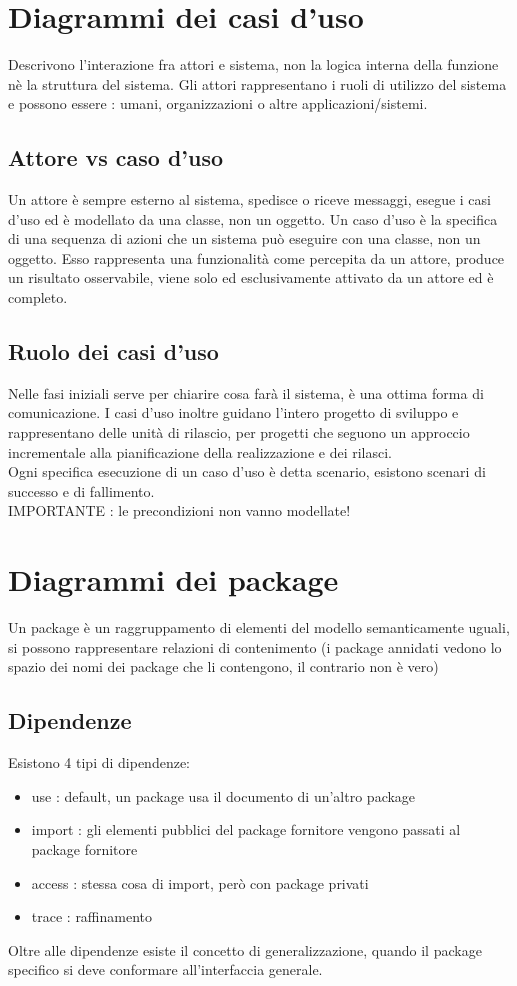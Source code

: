 \documentclass[a4paper,12pt]{report}
\begin{document}
	\section{Diagrammi dei casi d'uso}
	Descrivono l'interazione fra attori e sistema, non la logica interna della funzione nè la struttura del sistema. Gli attori rappresentano i ruoli di utilizzo del sistema e possono essere : umani, organizzazioni o altre applicazioni/sistemi.
	\subsection{Attore vs caso d'uso}
	Un attore è sempre esterno al sistema, spedisce o riceve messaggi, esegue i casi d'uso ed è modellato da una classe, non un oggetto.
	Un caso d'uso è la specifica di una sequenza di azioni che un sistema può eseguire con una classe, non un oggetto. Esso rappresenta una funzionalità come percepita da un attore, produce un risultato osservabile, viene solo ed esclusivamente attivato da un attore ed è completo.
	\subsection{Ruolo dei casi d'uso}
	Nelle fasi iniziali serve per chiarire cosa farà il sistema, è una ottima forma di comunicazione. I casi d'uso inoltre guidano l'intero progetto di sviluppo e rappresentano delle unità di rilascio, per progetti che seguono un approccio incrementale alla pianificazione della realizzazione e dei rilasci. \\
	Ogni specifica esecuzione di un caso d'uso è detta scenario, esistono scenari di successo e di fallimento.\\
	IMPORTANTE : le precondizioni non vanno modellate!
	\section{Diagrammi dei package}
	Un package è un raggruppamento di elementi del modello semanticamente uguali, si possono rappresentare relazioni di contenimento (i package annidati vedono lo spazio dei nomi dei package che li contengono, il contrario non è vero)
	\subsection{Dipendenze}
	Esistono 4 tipi di dipendenze:
	\begin{itemize}
		\item use : default, un package usa il documento di un'altro package
		\item import : gli elementi pubblici del package fornitore vengono passati al package fornitore
		\item access : stessa cosa di import, però con package privati
		\item trace : raffinamento
	\end{itemize}
	Oltre alle dipendenze esiste il concetto di generalizzazione, quando il package specifico si deve conformare all'interfaccia generale.
\end{document}
